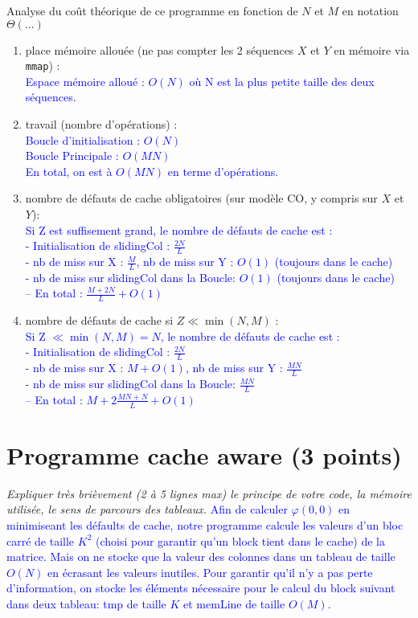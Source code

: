 \documentclass[10pt,a4paper]{article}
\begin{document}
Analyse du coût théorique de ce  programme en fonction de $N$ et $M$  en notation $\Theta(...)$ 
\begin{enumerate}
  \item place mémoire allouée (ne pas compter les 2 séquences $X$ et $Y$ en mémoire via {\tt mmap}) : \\
  \textcolor{blue}{
    Espace mémoire alloué : $O(N)$ où N est la plus petite taille des deux séquences.
  }
  \item travail (nombre d'opérations) : \\
  \textcolor{blue}{
    Boucle d'initialisation : $O(N)$ \\
    Boucle Principale       : $O(MN)$  \\
    En total, on est à $O(MN)$ en terme d'opérations.
  }
  \item nombre de défauts de cache obligatoires (sur modèle CO, y compris sur $X$ et $Y$): \\
  \textcolor{blue}{
    Si Z est suffisement grand, le nombre de défauts de cache est : \\
    - Initialisation de slidingCol : $\frac{2N}{L}$ \\
    - nb de miss sur X : $\frac{M}{L}$, nb de miss sur Y : $O(1)$ (toujours dans le cache) \\
    - nb de miss sur slidingCol dans la Boucle: $O(1)$ (toujours dans le cache) \\
    -- En total :  $\frac{M + 2N}{L} + O(1)$
  }
  \item nombre de défauts de cache si $Z \ll \min(N,M)$ : \\
  \textcolor{blue}{
    Si Z $\ll \min(N,M) = N$, le nombre de défauts de cache est : \\
    - Initialisation de slidingCol : $\frac{2N}{L}$ \\
    - nb de miss sur X : $M + O(1)$, nb de miss sur Y : $\frac{M N}{L}$ \\
    - nb de miss sur slidingCol dans la Boucle: $\frac{M N}{L}$\\
    -- En total :  $M + 2 \frac{MN + N}{L} + O(1)$
  }
\end{enumerate}

\section{Programme cache aware  (3 points)}
{\em Expliquer très brièvement (2 à 5 lignes max) le principe de votre code, la mémoire utilisée, le sens de parcours des tableaux.}
\textcolor{blue}{
Afin de calculer $\varphi (0,0)$ en minimiseant les défaults de cache, notre programme calcule les valeurs d'un bloc carré de taille $K^{2}$ (choisi pour garantir qu'un block tient dans le cache) de la matrice.
Mais on ne stocke que la valeur des colonnes dans un tableau de taille $O(N)$ en écrasant les valeurs inutiles. Pour garantir qu'il n'y a pas perte d'information, on stocke les éléments nécessaire pour le calcul du block suivant dans deux tableau: tmp de taille $K$ et memLine de taille $O(M)$.
}
\end{document}
